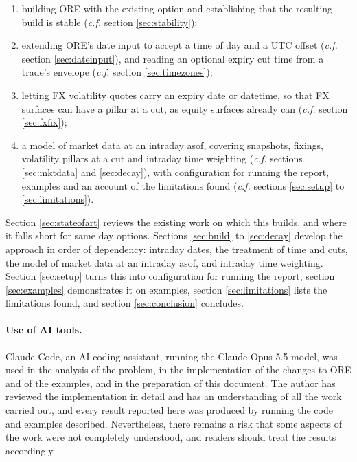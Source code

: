 \documentclass[12pt, a4paper]{article}
\begin{document}
\begin{enumerate}
\item building ORE with the existing option and establishing that the resulting build is stable (\textit{c.f.} section
  \ref{sec:stability});
\item extending ORE's date input to accept a time of day and a UTC offset (\textit{c.f.} section \ref{sec:dateinput}), and reading an
  optional expiry cut time from a trade's envelope (\textit{c.f.} section \ref{sec:timezones});
\item letting FX volatility quotes carry an expiry date or datetime, so that FX surfaces can have a pillar at a cut,
  as equity surfaces already can (\textit{c.f.} section \ref{sec:fxfix});
\item a model of market data at an intraday asof, covering snapshots, fixings, volatility pillars at a cut and
  intraday time weighting (\textit{c.f.} sections \ref{sec:mktdata} and \ref{sec:decay}), with configuration for running the report,
  examples and an account of the limitations found (\textit{c.f.} sections \ref{sec:setup} to \ref{sec:limitations}).
\end{enumerate}

Section \ref{sec:stateofart} reviews the existing work on which this builds, and where it falls short for same day
options. Sections \ref{sec:build} to \ref{sec:decay} develop the approach in order of dependency: intraday dates, the
treatment of time and cuts, the model of market data at an intraday asof, and intraday time weighting. Section
\ref{sec:setup} turns this into configuration for running the report, section \ref{sec:examples} demonstrates it on
examples, section \ref{sec:limitations} lists the limitations found, and section \ref{sec:conclusion} concludes.

\paragraph*{Use of AI tools.}\label{sec:aiuse} Claude Code, an AI coding assistant, running the Claude Opus 5.5 model, was used in
the analysis of the problem, in the implementation of the changes to ORE and of the examples, and in the preparation of
this document. The author has reviewed the implementation in detail and has an understanding of all the work carried
out, and every result reported here was produced by running the code and examples described. Nevertheless, there
remains a risk that some aspects of the work were not completely understood, and readers should treat the results
accordingly.
\end{document}
